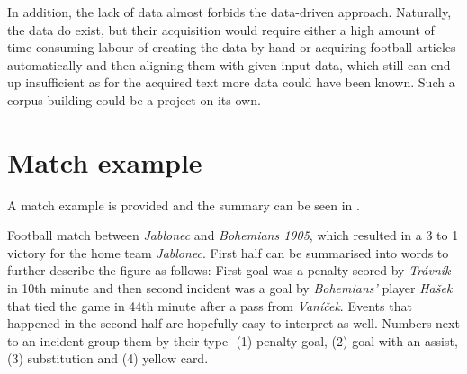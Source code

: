In addition, the lack of data almost forbids the data-driven approach. Naturally, the data do exist, but their acquisition would require either a high amount of time-consuming labour of creating the data by hand or acquiring football articles automatically and then aligning them with given input data, which still can end up insufficient as for the acquired text more data could have been known. Such a corpus building could be a project on its own.

\section{Match example}
A match example is provided and the summary can be seen in . 

Football match between \emph{Jablonec} and \emph{Bohemians 1905}, which resulted in a 3 to 1 victory for the home team \emph{Jablonec}. First half can be summarised into words to further describe the figure as follows: First goal was a penalty scored by \emph{Trávník} in 10th minute and then second incident was a goal by \emph{Bohemians'} player \emph{Hašek} that tied the game in 44th minute after a pass from \emph{Vaníček}. Events that happened in the second half are hopefully easy to interpret as well. Numbers next to an incident group them by their type- (1) penalty goal, (2) goal with an assist, (3) substitution and (4) yellow card. 

